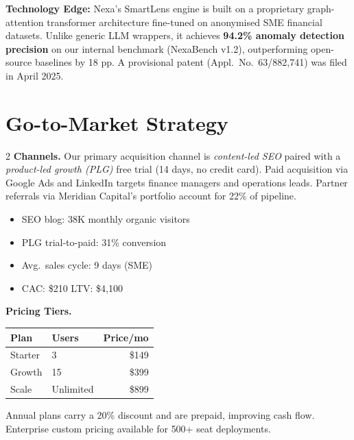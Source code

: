 \documentclass[11pt,a4paper]{article}
\newcommand{\sectionicon}[1]{\textcolor{NexaTeal}{#1}\hspace{4pt}}
\begin{document}
\par\vspace{6pt}

\begin{tcolorbox}[warnbox]
  \textbf{\textcolor{NexaGold}{\faStar}\enspace Technology Edge:} Nexa's SmartLens engine is built on a proprietary
  graph-attention transformer architecture fine-tuned on anonymised SME financial datasets.
  Unlike generic LLM wrappers, it achieves \textbf{94.2\% anomaly detection precision} on
  our internal benchmark (NexaBench v1.2), outperforming open-source baselines by 18 pp.
  A provisional patent (Appl.\ No.\ 63/882,741) was filed in April 2025.
\end{tcolorbox}

\section{\sectionicon{\faRocket}Go-to-Market Strategy}

\begin{multicols}{2}
\textbf{Channels.} Our primary acquisition channel is \textit{content-led SEO} paired with
a \textit{product-led growth (PLG)} free trial (14 days, no credit card). Paid
acquisition via Google Ads and LinkedIn targets finance managers and operations leads.
Partner referrals via Meridian Capital's portfolio account for 22\% of pipeline.

\vspace{4pt}
\begin{itemize}[leftmargin=14pt, itemsep=2pt]
  \item[\textcolor{NexaTeal}{\faChevronRight}] SEO blog: 38K monthly organic visitors
  \item[\textcolor{NexaTeal}{\faChevronRight}] PLG trial-to-paid: 31\% conversion
  \item[\textcolor{NexaTeal}{\faChevronRight}] Avg.\ sales cycle: 9 days (SME)
  \item[\textcolor{NexaTeal}{\faChevronRight}] CAC: \$210 \textbar{} LTV: \$4,100
\end{itemize}

\columnbreak

\textbf{Pricing Tiers.}
\begin{tabular}{@{}llr@{}}
  \toprule
  \textbf{Plan} & \textbf{Users} & \textbf{Price/mo} \\
  \midrule
  Starter   & 3  & \$149 \\
  Growth    & 15 & \$399 \\
  Scale     & Unlimited & \$899 \\
  \bottomrule
\end{tabular}

\vspace{6pt}
Annual plans carry a 20\% discount and are prepaid, improving cash flow. Enterprise
custom pricing available for 500+ seat deployments.
\end{multicols}
\end{document}
